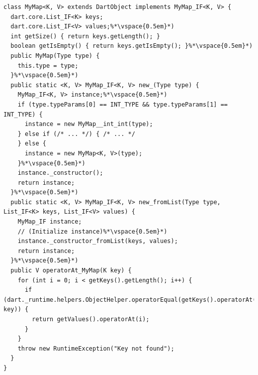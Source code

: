 \documentclass[sigplan]{acmart}
\begin{document}
\begin{mdframed}[outerlinewidth=0.1pt,outerlinecolor=black,skipabove=4pt,
  innerleftmargin=5pt,innerrightmargin=0pt,innertopmargin=0pt,innerbottommargin=0pt]
\begin{lstlisting}[basicstyle=\scriptsize\ttfamily]
class MyMap<K, V> extends DartObject implements MyMap_IF<K, V> {
  dart.core.List_IF<K> keys;
  dart.core.List_IF<V> values;%*\vspace{0.5em}*)
  int getSize() { return keys.getLength(); }
  boolean getIsEmpty() { return keys.getIsEmpty(); }%*\vspace{0.5em}*)
  public MyMap(Type type) {
    this.type = type;
  }%*\vspace{0.5em}*)
  public static <K, V> MyMap_IF<K, V> new_(Type type) {
  	MyMap_IF<K, V> instance;%*\vspace{0.5em}*)
    if (type.typeParams[0] == INT_TYPE && type.typeParams[1] == INT_TYPE) {
      instance = new MyMap__int_int(type);
    } else if (/* ... */) { /* ... */
    } else {
      instance = new MyMap<K, V>(type);
    }%*\vspace{0.5em}*)
    instance._constructor();
    return instance;
  }%*\vspace{0.5em}*)
  public static <K, V> MyMap_IF<K, V> new_fromList(Type type, List_IF<K> keys, List_IF<V> values) {
  	MyMap_IF instance;
    // (Initialize instance)%*\vspace{0.5em}*)
    instance._constructor_fromList(keys, values);
    return instance;
  }%*\vspace{0.5em}*)
  public V operatorAt_MyMap(K key) {
    for (int i = 0; i < getKeys().getLength(); i++) {
      if (dart._runtime.helpers.ObjectHelper.operatorEqual(getKeys().operatorAt(i), key)) {
        return getValues().operatorAt(i);
      }
    }
    throw new RuntimeException("Key not found");
  }
}
\end{lstlisting}
\end{mdframed}
\end{document}
